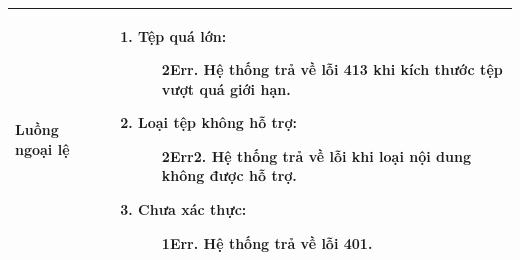 {\begin{tabularx}{\textwidth}{|>{\raggedright\arraybackslash}X|>{\raggedright\arraybackslash}X|}
\hline
\textbf{Luồng ngoại lệ} &
\begin{enumerate}
    \item \textbf{Tệp quá lớn:}
    \begin{enumerate}
        \item[2Err.] Hệ thống trả về lỗi 413 khi kích thước tệp vượt quá giới hạn.
    \end{enumerate}
    \item \textbf{Loại tệp không hỗ trợ:}
    \begin{enumerate}
        \item[2Err2.] Hệ thống trả về lỗi khi loại nội dung không được hỗ trợ.
    \end{enumerate}
    \item \textbf{Chưa xác thực:}
    \begin{enumerate}
        \item[1Err.] Hệ thống trả về lỗi 401.
    \end{enumerate}
\end{enumerate} \\
\hline
\end{tabularx}
}
